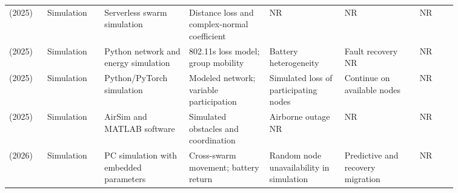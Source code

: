 \begin{table}[!tp]
\begin{tabular}{@{}Y{0.0705\linewidth}Y{0.1090\linewidth}Y{0.1598\linewidth}Y{0.1532\linewidth}Y{0.1466\linewidth}Y{0.1438\linewidth}Y{0.0724\linewidth}@{}}
\cite{R0022}\newline\mbox{(2025)} & Simulation & Serverless swarm simulation & Distance loss and complex-normal coefficient & NR & NR & NR \\
\cite{R0083}\newline\mbox{(2025)} & Simulation & Python network and energy simulation & 802.11s loss model; group mobility & Battery heterogeneity & Fault recovery NR & NR \\
\cite{R0106}\newline\mbox{(2025)} & Simulation & Python\allowbreak{}/PyTorch simulation & Modeled network; variable participation & Simulated loss of participating nodes & Continue on available nodes & NR \\
\cite{R0223}\newline\mbox{(2025)} & Simulation & AirSim and MATLAB software & Simulated obstacles and coordination & Airborne outage NR & NR & NR \\
\cite{R0002}\newline\mbox{(2026)} & Simulation & PC simulation with embedded parameters & Cross-swarm movement; battery return & Random node unavailability in simulation & Predictive and recovery migration & NR \\
\bottomrule
\end{tabular}
\end{table}


